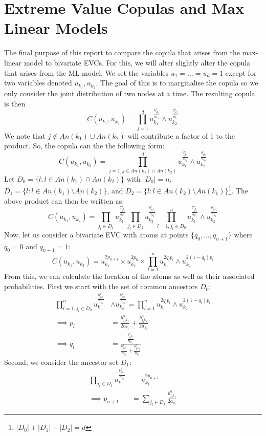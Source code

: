 \documentclass[12pt]{article}
\newcommand{\ds}{\displaystyle}
\theoremstyle{definition}
\theoremstyle{definition}
\begin{document}
\section{Extreme Value Copulas and Max Linear Models}
The final purpose of this report to compare the copula that arises from the max-linear model to bivariate EVCs. For this, we will alter slightly alter the copula that arises from the ML model. We set the variables $u_1=\hdots=u_d=1$ except for two variables denoted $u_{k_1},u_{k_2}$. The goal of this is to marginalise the copula so we only consider the joint distribution of two nodes at a time. The resulting copula is then 
$$C(u_{k_1},u_{k_2})=\prod_{j=1}^du_{k_1}^{\frac{b_{jk_1}^\alpha}{a_{k_1}}}\wedge u_{k_2}^{\frac{b_{jk_2}^\alpha}{a_{k_2}}}$$
We note that $j\notin An(k_1)\cup An(k_2)$ will contribute a factor of 1 to the product. So, the copula can the the following form:
$$C(u_{k_1},u_{k_2})=\prod_{j=1,j\in An(k_1)\cup An(k_2) }^du_{k_1}^{\frac{b_{jk_1}^\alpha}{a_{k_1}}}\wedge u_{k_2}^{\frac{b_{jk_2}^\alpha}{a_{k_2}}}$$
Let $D_0=\{l:l\in An(k_1)\cap An(k_2)\}$ with $|D_0|=n$, $D_1=\{l:l\in An(k_1)\setminus An(k_2)\}$, and $D_2=\{l:l\in An(k_2)\setminus An(k_1)\}$\footnote{$|D_0|+|D_1|+|D_2|=d$}.
The above product can then be written as:
$$C(u_{k_1},u_{k_2})=\prod_{j_l\in D_1 }u_{k_1}^{\frac{b_{j_lk_1}^\alpha}{a_{k_1}}} \prod_{j_l\in D_2 }u_{k_2}^{\frac{b_{j_lk_2}^\alpha}{a_{k_2}}}\prod_{l=1,j_l\in D_0 }^n u_{k_1}^{\frac{b_{j_lk_1}^\alpha}{a_{k_1}}}\wedge u_{k_2}^{\frac{b_{j_lk_2}^\alpha}{a_{k_2}}}$$
Now, let us consider a bivariate EVC with atoms at points $\ds\{q_0,\hdots,q_{n+1}\}$ where $q_0=0$ and $q_{n+1}=1$:
$$C(u_{k_1},u_{k_2})= u_{k_1}^{2p_{n+1}} \times u_{k_2}^{2p_0}\times  \prod_{l=1}^{n} u_{k_1}^{2q_lp_l}\wedge u_{k_2}^{2(1-q_l)p_l}$$
From this, we can calculate the location of the atoms as well as their associated probabilities. First we start with the set of common ancestors $D_0$:
\begin{align*}
    \prod_{l=1,j_l\in D_0}^nu_{k_1}^{\frac{b_{j_lk_1}^\alpha}{a_{k_1}}}&\wedge u_{k_2}^{\frac{b_{j_lk_2}^\alpha}{a_{k_2}}}=\prod_{l=1}^{n} u_{k_1}^{2q_lp_l}\wedge u_{k_2}^{2(1-q_l)p_l}\\
    \implies p_l&=\frac{b_{j_lk_1}^\alpha}{2a_{k_1}}+\frac{b_{j_lk_2}^\alpha}{2a_{k_2}}\\
    \implies q_l&=\frac{\frac{b_{j_lk_1}^\alpha}{a_{k_1}}}{\frac{b_{j_lk_1}^\alpha}{a_{k_1}}+\frac{b_{j_lk_2}^\alpha}{a_{k_2}}}
\end{align*}
Second, we consider the ancestor set $D_1$:
\begin{align*}
    \prod_{j_l\in D_1 }u_{k_1}^{\frac{b_{j_lk_1}^\alpha}{a_{k_1}}} &=  u_{k_1}^{2p_{n+1}}\\
    \implies p_{n+1}&= \sum_{j_l \in D_1}\frac{b_{j_lk_1}^\alpha}{2a_{k_1}}
\end{align*}
\end{document}
